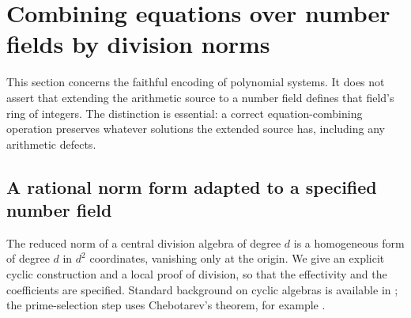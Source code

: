 \section{Combining equations over number fields by division norms}
\label{sec:division-norm-compiler-phase3}

This section concerns the faithful encoding of polynomial systems.
It does not assert that extending the arithmetic source to a number
field defines that field's ring of integers.  The distinction is
essential: a correct equation-combining operation preserves whatever
solutions the extended source has, including any arithmetic defects.

\subsection{A rational norm form adapted to a specified number field}

The reduced norm of a central division algebra of degree $d$ is a
homogeneous form of degree $d$ in $d^2$ coordinates, vanishing only
at the origin.  We give an explicit cyclic construction and a local
proof of division, so that the effectivity and the coefficients are
specified.  Standard background on cyclic algebras is available in
\cite[Chapter IV]{MilneCFT2020}; the prime-selection step uses
Chebotarev's theorem, for example \cite[Section 2.4]{KedlayaCFT}.

